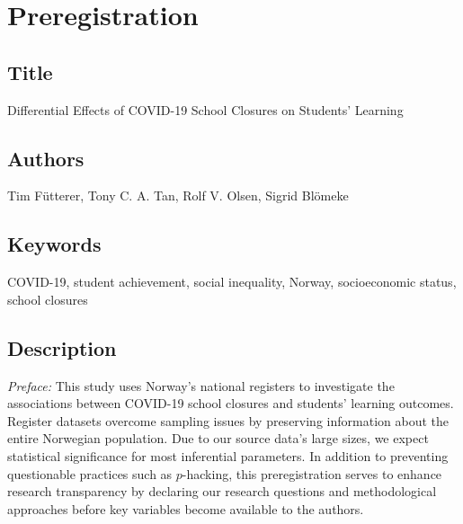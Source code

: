 \section{Preregistration}

\subsection{Title}
Differential Effects of COVID-19 School Closures on Students' Learning

\subsection{Authors}
Tim F{\"u}tterer, Tony C. A. Tan, Rolf V. Olsen, Sigrid Bl{\"o}meke

\subsection{Keywords}
COVID-19, student achievement, social inequality, Norway, socioeconomic status, school closures

\subsection{Description}
\textit{Preface:} This study uses Norway's national registers to investigate the associations between COVID-19 school closures and students' learning outcomes. Register datasets overcome sampling issues by preserving information about the entire Norwegian population. Due to our source data's large sizes, we expect statistical significance for most inferential parameters. In addition to preventing questionable practices such as $p$-hacking, this preregistration serves to enhance research transparency by declaring our research questions and methodological approaches before key variables become available to the authors.

